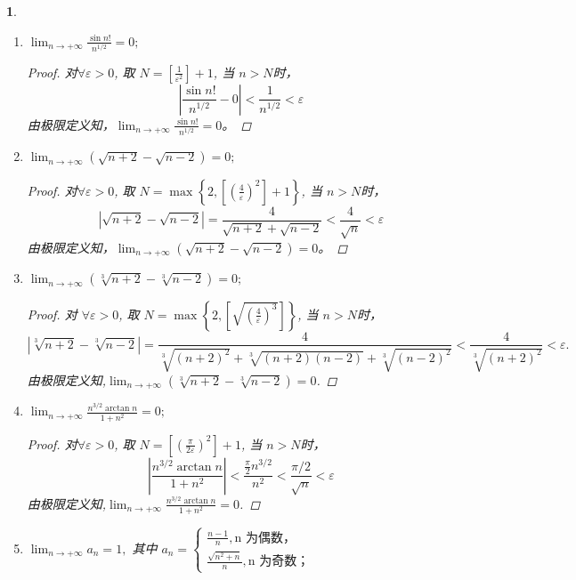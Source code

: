 \documentclass[utf8]{book}
\newtheorem{example}{}[section]             %
\begin{document}
\begin{example}
\begin{enumerate}
        \item $\displaystyle \lim_{n\to +\infty}\frac{\sin n!}{n^{1/2}} = 0;$
        \begin{proof}
         对$\forall \varepsilon > 0$, 取 $N = \left [\frac{1}{\varepsilon^2}\right ] + 1$, 当 $n > N$时，
        $$\left | \frac{\sin n!}{n^{1/2}} - 0\right | < \frac{1}{n^{1/2}} < \varepsilon$$
        由极限定义知，$\displaystyle\lim_{n\to +\infty}\frac{\sin n!}{n^{1/2}} = 0$。  
        \end{proof}
        
        \item $\displaystyle \lim_{n\to +\infty}(\sqrt{n+2}-\sqrt{n-2}) = 0;$
        \begin{proof}
         对$\forall \varepsilon > 0$, 取 $N = \max\left\{2, \left [ \left(\frac{4}{\varepsilon}\right)^2\right ] + 1\right\}$, 当 $n > N$时，
        $$\left | \sqrt{n+2}-\sqrt{n-2}\right | = \frac{4}{\sqrt{n+2}+\sqrt{n-2}} < \frac{4}{\sqrt{n}} < \varepsilon$$
        由极限定义知，$\displaystyle\lim_{n\to +\infty}(\sqrt{n+2}-\sqrt{n-2}) = 0$。  
        \end{proof}
        
        \item $\displaystyle \lim_{n\to +\infty}(\sqrt[3]{n+2}-\sqrt[3]{n-2}) = 0;$
        \begin{proof}
         对 $\forall \varepsilon > 0$, 取 $N = \max\left\{2, \left [ \sqrt{\left(\frac{4}{\varepsilon}\right)^3}\right ]\right\}$, 当 $n > N$时，
$$\left|\sqrt[3]{n+2}-\sqrt[3]{n-2}\right| = \frac{4}{\sqrt[3]{(n+2)^2}+\sqrt[3]{(n+2)(n-2)} + \sqrt[3]{(n-2)^2}} < \frac{4}{\sqrt[3]{(n+2)^2}}< \varepsilon.$$
        由极限定义知,$\displaystyle\lim_{n\to +\infty}(\sqrt[3]{n+2}-\sqrt[3]{n-2}) = 0$.  
        \end{proof}
        
        \item $\displaystyle \lim_{n\to +\infty}\frac{n^{3/2}\arctan{n}}{1+n^2} = 0;$
        \begin{proof}
         对$\forall \varepsilon > 0$, 取 $N = \left [ \left(\frac{\pi}{2\varepsilon}\right)^2\right ] + 1$, 当 $n > N$时，
         $$\left | \frac{n^{3/2}\arctan{n}}{1+n^2} \right | < \frac{\frac{\pi}{2}n^{3/2}}{n^2} < \frac{\pi / 2}{\sqrt{n}} < \varepsilon$$
        由极限定义知,$\displaystyle\lim_{n\to +\infty}\frac{n^{3/2}\arctan{n}}{1+n^2} = 0$.  
        \end{proof} 
        
        \item $\displaystyle \lim_{n\to +\infty}a_n = 1,$ 其中 
        $a_n = 
         \begin{cases}
         \displaystyle\frac{n-1}{n}, \text{n 为偶数，}\\
         \displaystyle\frac{\sqrt{n^2+ n}}{n}, \text{n 为奇数；}
		\end{cases}$      
		

\end{enumerate}
\end{example}
\end{document}
